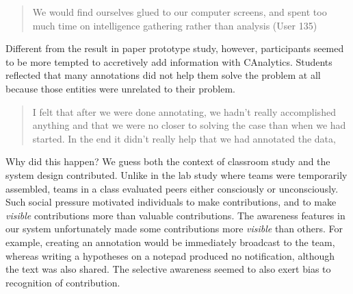 \begin{quote}
We would find ourselves glued to our computer screens, and spent too
much time on intelligence gathering rather than analysis (User 135)
\end{quote}

Different from the result in paper prototype study, however,
participants seemed to be more tempted to accretively add information
with CAnalytics. Students reflected that many annotations did not help
them solve the problem at all because those entities were unrelated to
their problem.

\begin{quote}
I felt that after we were done annotating, we hadn't really accomplished
anything and that we were no closer to solving the case than when we had
started. In the end it didn't really help that we had annotated the
data,
\end{quote}

Why did this happen? We guess both the context of classroom study and
the system design contributed. Unlike in the lab study where teams were
temporarily assembled, teams in a class evaluated peers either
consciously or unconsciously. Such social pressure motivated individuals
to make contributions, and to make \emph{visible} contributions more
than valuable contributions. The awareness features in our system
unfortunately made some contributions more \emph{visible} than others.
For example, creating an annotation would be immediately broadcast to
the team, whereas writing a hypotheses on a notepad produced no
notification, although the text was also shared. The selective awareness
seemed to also exert bias to recognition of contribution.
